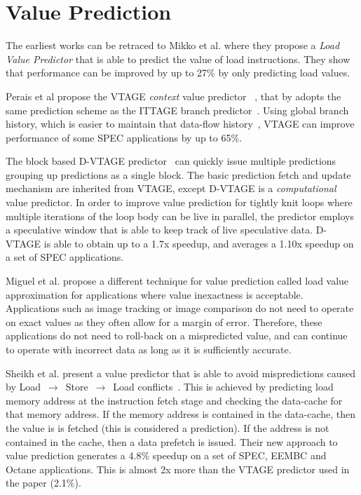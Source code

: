 \section{Value Prediction}
The earliest works can be retraced to Mikko et al. where they propose a \textit{Load Value Predictor} \cite{lipasti96valpred} that is able to predict the value of load instructions.
They show that performance can be improved by up to 27\% by only predicting load values.

Perais et al propose the VTAGE \textit{context} value predictor ~\cite{peraisVTAGE2014}, that by adopts the same prediction scheme as the ITTAGE branch predictor~\cite{SeznecITTAGE}.
Using global branch history, which is easier to maintain that data-flow history~\cite{peraisVTAGE2014}, VTAGE can improve performance of some SPEC applications by up to 65\%.

The block based D-VTAGE predictor~\cite{peraisBeBop2015} can quickly issue multiple predictions grouping up predictions as a single block.
The basic prediction fetch and update mechanism are inherited from VTAGE, except D-VTAGE is a \textit{computational} value predictor.
In order to improve value prediction for tightly knit loops where multiple iterations of the loop body can be live in parallel, the predictor employs a speculative window that is able to keep track of live speculative data.
D-VTAGE is able to obtain up to a 1.7x speedup, and averages a 1.10x speedup on a set of SPEC applications. 

Miguel et al. propose a different technique for value prediction called load value approximation \cite{miguel2014LoadVal} for applications where value inexactness is acceptable.
Applications such as image tracking or image comparison do not need to operate on exact values as they often allow for a margin of error.
Therefore, these applications do not need to roll-back on a mispredicted value, and can continue to operate with incorrect data as long as it is sufficiently accurate.

Sheikh et al. present a value predictor that is able to avoid mispredictions caused by Load $\,\to\,$ Store $\,\to\,$ Load conflicts~\cite{sheikh2017value}.
This is achieved by predicting load memory address at the instruction fetch stage and checking the data-cache for that memory address.
If the memory address is contained in the data-cache, then the value is is fetched (this is considered a prediction).
If the address is not contained in the cache, then a data prefetch is issued.
Their new approach to value prediction generates a 4.8\% speedup on a set of SPEC, EEMBC and Octane applications.
This is almost 2x more than the VTAGE predictor used in the paper (2.1\%).

